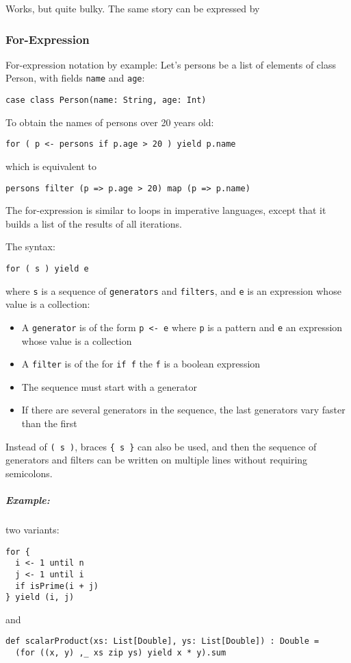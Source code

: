 \documentclass{scrartcl}
\newcommand{\example}{\subparagraph{Example:}} %
\newcommand{\term}[1]{\verb~#1~} %
\begin{document}
Works, but quite bulky. The same story can be expressed by

\subsubsection{For-Expression}
\label{sec:ForExpression}
For-expression notation by example:
Let's persons be a list of elements of class Person, with fields \lstinline|name|
and \lstinline|age|:
\begin{lstlisting}
case class Person(name: String, age: Int)
\end{lstlisting}
To obtain the names of persons over 20 years old:
\begin{lstlisting}
for ( p <- persons if p.age > 20 ) yield p.name
\end{lstlisting}
which is equivalent to
\begin{lstlisting}
persons filter (p => p.age > 20) map (p => p.name)
\end{lstlisting}

The for-expression is similar to loops in imperative languages, except that it
builds a list of the results of all iterations.

The syntax:
\begin{lstlisting}
for ( s ) yield e
\end{lstlisting}

where \lstinline|s| is a sequence of \term{generators} and \term{filters}, and
\lstinline|e| is an expression whose value is a collection:
\begin{itemize}
\item A \term{generator} is of the form \lstinline|p <- e| where \lstinline|p|
  is a pattern and \lstinline|e| an expression whose value is a collection
\item A \term{filter} is of the for \lstinline|if f| the \lstinline|f| is a
  boolean expression
\item The sequence must start with a generator 
\item If there are several generators in the sequence, the last generators vary
  faster than the first
\end{itemize}

Instead of \lstinline|( s )|, braces \lstinline|{ s }| can also be used, and
then the sequence of generators and filters can be written on multiple lines
without requiring semicolons.

\example two variants:
\begin{lstlisting}
for {
  i <- 1 until n
  j <- 1 until i
  if isPrime(i + j)
} yield (i, j)
\end{lstlisting}
and
\begin{lstlisting}
def scalarProduct(xs: List[Double], ys: List[Double]) : Double =
  (for ((x, y) ,_ xs zip ys) yield x * y).sum
\end{lstlisting}
\end{document}
